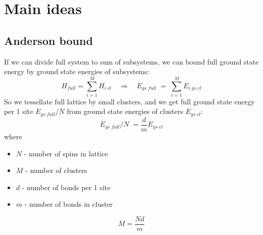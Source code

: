 \documentclass[a4paper]{jpconf}
\renewcommand\[{\begin{equation}}
\renewcommand\]{\end{equation}}
\begin{document}
\section{Main ideas}
\subsection{Anderson bound \cite{Anderson}}
If we can divide full system to sum of subsystems, we can bound full ground state energy by ground state energies of subsystems:
\[{H_{full}} = \sum\limits_{i = 1}^M {{H_{i\;cl}}} \quad  \Rightarrow \quad {E_{gs\;full}}\;=\;\sum\limits_{i = 1}^M {{E_{i\;gs\;cl}}} \]
So we tessellate full lattice by small clusters, and we get full ground state energy per 1 site $E_{gs\;full}/N$ from 
ground state energies of clusters $E_{gs\;cl}$:
\[{E_{gs\;full}}/N\;=\frac{d}{m}{E_{gs\;cl}}\]
where
\begin{itemize}
	\item $N$ - number of spins in lattice
	\item $M$ - number of clusters
	\item $d$ - number of bonds per 1 site
	\item $m$ - number of bonds in cluster
\end{itemize}
\[M = \frac{{Nd}}{m} \label{MNdm} \]
\end{document}

